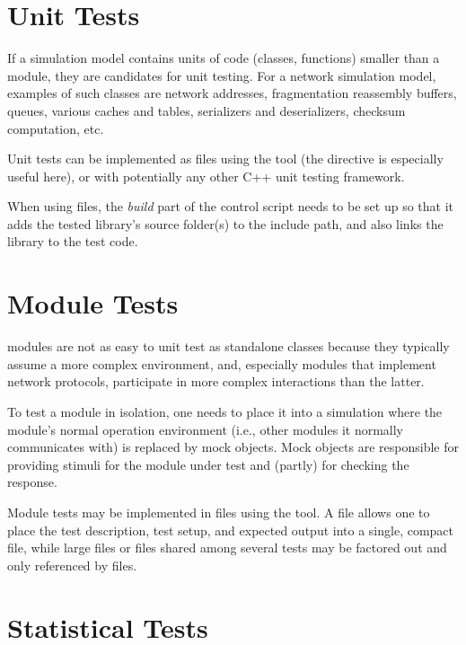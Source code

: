 \section{Unit Tests}
\label{sec:testing:unit-tests}

If a simulation model contains units of code (classes, functions) smaller than a
module, they are candidates for unit testing. For a network simulation model,
examples of such classes are network addresses, fragmentation reassembly
buffers, queues, various caches and tables, serializers and deserializers,
checksum computation, etc.

Unit tests can be implemented as  files using the 
tool (the  directive is especially useful here), or with
potentially any other C++ unit testing framework.

When using  files, the \textit{build} part of the control script
needs to be set up so that it adds the tested library's source folder(s) to the
include path, and also links the library to the test code.



\section{Module Tests}
\label{sec:testing:module-tests}

{\opp} modules are not as easy to unit test as standalone classes because
they typically assume a more complex environment, and, especially modules
that implement network protocols, participate in more complex interactions
than the latter.

To test a module in isolation, one needs to place it into a simulation where
the module's normal operation environment (i.e., other modules it normally
communicates with) is replaced by mock objects. Mock objects are responsible
for providing stimuli for the module under test and (partly) for checking
the response.

Module tests may be implemented in  files using the 
tool. A  file allows one to place the test description, test setup,
and expected output into a single, compact file, while large files or files shared
among several tests may be factored out and only referenced by  files.


\section{Statistical Tests}
\label{sec:testing:statistical-tests}

